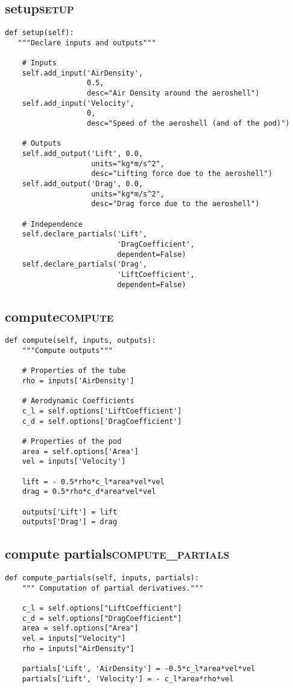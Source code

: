 \documentclass[11pt]{article}
\begin{document}
\subsection{setup\hfill{}\textsc{setup}}
\label{sec:org982cec4}
\begin{verbatim}
def setup(self):
   """Declare inputs and outputs"""

    # Inputs
    self.add_input('AirDensity', 
                   0.5,
                   desc="Air Density around the aeroshell")
    self.add_input('Velocity', 
                   0,
                   desc="Speed of the aeroshell (and of the pod)")

    # Outputs
    self.add_output('Lift', 0.0,
                    units="kg*m/s^2",
                    desc="Lifting force due to the aeroshell")
    self.add_output('Drag', 0.0, 
                    units="kg*m/s^2",
                    desc="Drag force due to the aeroshell")

    # Independence
    self.declare_partials('Lift',
                          'DragCoefficient',
                          dependent=False)
    self.declare_partials('Drag',
                          'LiftCoefficient',
                          dependent=False)
\end{verbatim}
\subsection{compute\hfill{}\textsc{compute}}
\label{sec:orge4cdb70}
\begin{verbatim}
def compute(self, inputs, outputs):
    """Compute outputs"""

    # Properties of the tube
    rho = inputs['AirDensity']

    # Aerodynamic Coefficients
    c_l = self.options['LiftCoefficient']
    c_d = self.options['DragCoefficient']

    # Properties of the pod
    area = self.options['Area']
    vel = inputs['Velocity']

    lift = - 0.5*rho*c_l*area*vel*vel
    drag = 0.5*rho*c_d*area*vel*vel

    outputs['Lift'] = lift
    outputs['Drag'] = drag
\end{verbatim}
\subsection{compute partials\hfill{}\textsc{compute\_partials}}
\label{sec:org7963462}
\begin{verbatim}
def compute_partials(self, inputs, partials):
    """ Computation of partial derivatives."""

    c_l = self.options["LiftCoefficient"]
    c_d = self.options["DragCoefficient"]
    area = self.options["Area"]
    vel = inputs["Velocity"]
    rho = inputs["AirDensity"]

    partials['Lift', 'AirDensity'] = -0.5*c_l*area*vel*vel
    partials['Lift', 'Velocity'] = - c_l*area*rho*vel
\end{verbatim}
\end{document}
